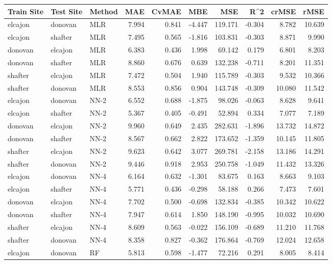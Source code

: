 \begin{table}[h]
\begin{tabular}{lllrrrrrrr}
\toprule
 Train Site & Test Site & Method &   MAE &  CvMAE &       MBE &     MSE &   R\textasciicircum2 &  crMSE &   rMSE \\
\midrule
elcajon & donovan & MLR & 7.994 & 0.841 & -4.447 & 119.171 & -0.304 & 8.782 & 10.639\\
elcajon & shafter & MLR & 7.495 & 0.565 & -1.816 & 103.831 & -0.303 & 8.871 & 9.990\\
donovan & elcajon & MLR & 6.383 & 0.436 & 1.998 & 69.142 & 0.179 & 6.801 & 8.203\\
donovan & shafter & MLR & 8.860 & 0.676 & 0.639 & 132.238 & -0.711 & 8.201 & 11.351\\
shafter & elcajon & MLR & 7.472 & 0.504 & 1.940 & 115.789 & -0.303 & 9.532 & 10.366\\
shafter & donovan & MLR & 8.553 & 0.856 & 0.904 & 143.748 & -0.309 & 10.080 & 11.542\\
elcajon & donovan & NN-2 & 6.552 & 0.688 & -1.875 & 98.026 & -0.063 & 8.628 & 9.641\\
elcajon & shafter & NN-2 & 5.367 & 0.405 & -0.491 & 52.894 & 0.334 & 7.077 & 7.189\\
donovan & elcajon & NN-2 & 9.960 & 0.649 & 2.435 & 282.631 & -1.896 & 13.732 & 14.872\\
donovan & shafter & NN-2 & 8.567 & 0.662 & 2.822 & 173.652 & -1.359 & 10.145 & 11.805\\
shafter & elcajon & NN-2 & 9.623 & 0.642 & 3.077 & 269.781 & -2.158 & 13.186 & 14.291\\
shafter & donovan & NN-2 & 9.446 & 0.918 & 2.953 & 250.758 & -1.049 & 11.432 & 13.326\\
elcajon & donovan & NN-4 & 6.164 & 0.632 & -1.301 & 83.675 & 0.163 & 8.663 & 9.103\\
elcajon & shafter & NN-4 & 5.771 & 0.436 & -0.298 & 58.188 & 0.266 & 7.473 & 7.601\\
donovan & elcajon & NN-4 & 7.702 & 0.500 & -0.698 & 132.834 & -0.385 & 10.342 & 10.622\\
donovan & shafter & NN-4 & 7.947 & 0.614 & 1.850 & 148.190 & -0.995 & 10.032 & 10.690\\
shafter & elcajon & NN-4 & 8.609 & 0.563 & -0.022 & 156.109 & -0.689 & 11.210 & 11.768\\
shafter & donovan & NN-4 & 8.358 & 0.827 & -0.362 & 176.864 & -0.769 & 12.024 & 12.658\\
elcajon & donovan & RF & 5.813 & 0.598 & -1.477 & 72.216 & 0.291 & 8.005 & 8.414\\

\end{tabular}
\end{table}
